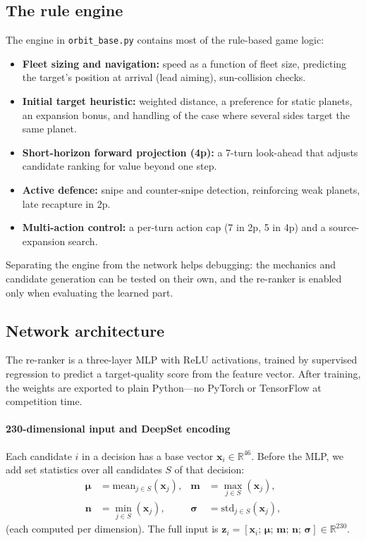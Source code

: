 \documentclass[conference]{IEEEtran}
\begin{document}
\subsection{The rule engine}

The engine in \texttt{orbit\_base.py} contains most of the rule-based game logic:
\begin{itemize}
\item \textbf{Fleet sizing and navigation:} speed as a function of fleet size, predicting the target's position at arrival (lead aiming), sun-collision checks.
\item \textbf{Initial target heuristic:} weighted distance, a preference for static planets, an expansion bonus, and handling of the case where several sides target the same planet.
\item \textbf{Short-horizon forward projection (4p):} a 7-turn look-ahead that adjusts candidate ranking for value beyond one step.
\item \textbf{Active defence:} snipe and counter-snipe detection, reinforcing weak planets, late recapture in 2p.
\item \textbf{Multi-action control:} a per-turn action cap (7 in 2p, 5 in 4p) and a source-expansion search.
\end{itemize}
Separating the engine from the network helps debugging: the mechanics and candidate generation can be tested on their own, and the re-ranker is enabled only when evaluating the learned part.

\subsection{Network architecture}
\label{sec:network}

The re-ranker is a three-layer MLP with ReLU activations, trained by supervised regression to predict a target-quality score from the feature vector. After training, the weights are exported to plain Python---no PyTorch or TensorFlow at competition time.

\paragraph{230-dimensional input and DeepSet encoding}
Each candidate $i$ in a decision has a base vector $\mathbf{x}_i \in \mathbb{R}^{46}$. Before the MLP, we add set statistics over all candidates $S$ of that decision:
\begin{align}
\boldsymbol{\mu} &= \mathrm{mean}_{j \in S}(\mathbf{x}_j), &
\mathbf{m} &= \max_{j \in S}(\mathbf{x}_j), \\
\mathbf{n} &= \min_{j \in S}(\mathbf{x}_j), &
\boldsymbol{\sigma} &= \mathrm{std}_{j \in S}(\mathbf{x}_j),
\end{align}
(each computed per dimension). The full input is $\mathbf{z}_i = [\mathbf{x}_i;\, \boldsymbol{\mu};\, \mathbf{m};\, \mathbf{n};\, \boldsymbol{\sigma}] \in \mathbb{R}^{230}$.
\end{document}
